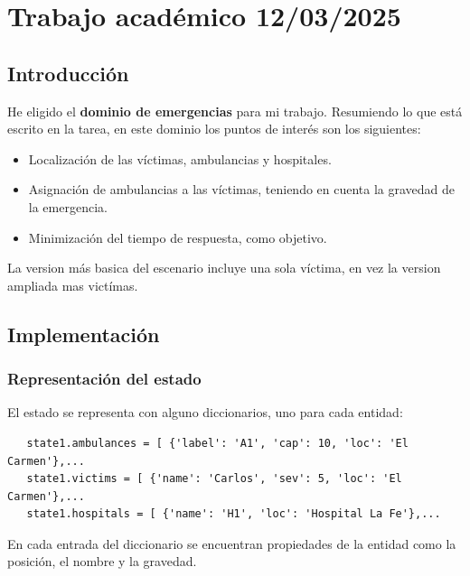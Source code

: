 \chapter*{Trabajo académico 12/03/2025}

\lstset{language=python}




\section{Introducción}

He eligido el \textbf{dominio de emergencias} para mi trabajo. Resumiendo lo que está escrito en la tarea, en este dominio los puntos de interés son los siguientes:
\begin{itemize}
   \item Localización de las víctimas, ambulancias y hospitales.
   \item Asignación de ambulancias a las víctimas, teniendo en cuenta la gravedad de la emergencia.
   \item Minimización del tiempo de respuesta, como objetivo.
\end{itemize}

La version más basica del escenario incluye una sola víctima, en vez la version ampliada mas victímas.

\section{Implementación}

\subsection{Representación del estado}
El estado se representa con alguno diccionarios, uno para cada entidad:
\begin{lstlisting}
   state1.ambulances = [ {'label': 'A1', 'cap': 10, 'loc': 'El Carmen'},...
   state1.victims = [ {'name': 'Carlos', 'sev': 5, 'loc': 'El Carmen'},...
   state1.hospitals = [ {'name': 'H1', 'loc': 'Hospital La Fe'},...
\end{lstlisting}
En cada entrada del diccionario se encuentran propiedades de la entidad como la posición, el nombre y la gravedad.

